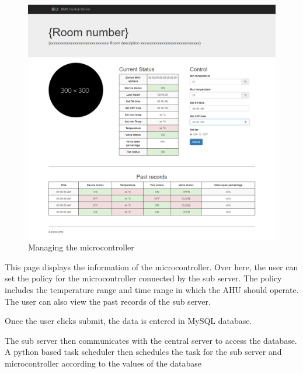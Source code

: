\documentclass[letterpaper,11pt]{report}
\begin{document}
\newpage
\begin{figure}[h]
\includegraphics[width=\textwidth]{arduino1}
\centering
\captionsetup{justification=centering}
\caption{Managing the microcontroller}
\label{fig:arduino1}
\end{figure}
\newpage This page displays the information of the microcontroller. Over here, the user can set the policy for the microcontroller connected by the sub server. The policy includes the temperature range and time range in which the AHU should operate. The user can also view the past records of the sub server.
\par
Once the user clicks submit, the data is entered in MySQL database.
\par
The sub server then communicates with the central server to access the database. A python based task scheduler then schedules the task for the sub server and microcontroller according to the values of the database

\newpage
\nocite*{}


\end{document}
